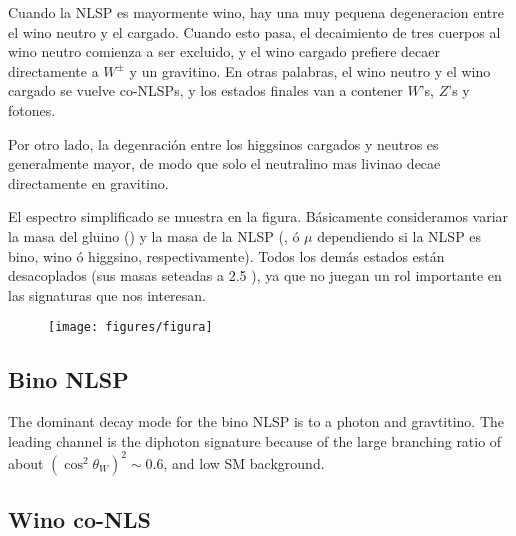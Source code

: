 Cuando la NLSP es mayormente wino, hay una muy pequena degeneracion entre el wino neutro y el
cargado. Cuando esto pasa, el decaimiento de tres cuerpos al wino neutro comienza
a ser excluido, y el wino cargado prefiere decaer directamente a $W^{\pm}$ y un gravitino.
En otras palabras, el wino neutro y el wino cargado se vuelve co-NLSPs, y los estados finales van
a contener $W$'s, $Z$'s y fotones.

Por otro lado, la degenraci\'on entre los higgsinos cargados y neutros es generalmente mayor, de modo
que solo el neutralino mas livinao decae directamente en gravitino.

El espectro simplificado se muestra en la figura. Básicamente consideramos variar
la masa del gluino () y la masa de la NLSP (,  ó $\mu$ dependiendo
si la NLSP es bino, wino ó higgsino, respectivamente). Todos los demás estados
están desacoplados (sus masas seteadas a 2.5 \tev), ya que no juegan un rol importante
en las signaturas que nos interesan.

\begin{figure}[h]
  \centering
  \texttt{[image: figures/figura]}
\end{figure}



\subsection{Bino NLSP}

The dominant decay mode for the bino NLSP is to a photon and gravtitino. The leading channel is the diphoton signature because of the large branching ratio of about $(\cos^2\theta_W)^2 \sim 0.6$,
and low SM background.

\subsection{Wino co-NLS}

